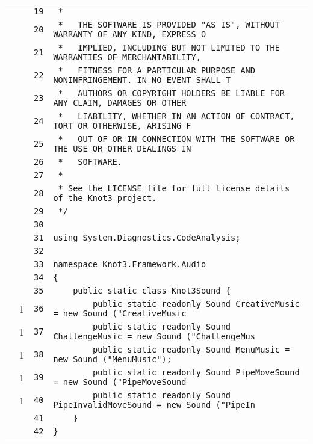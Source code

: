 \documentclass[a4paper,10pt]{article}
\begin{document}
\begin{longtable}[l]{lrrl}
\cellcolor{gray} &  & \verb~19~ & \verb~ *~\\
\cellcolor{gray} &  & \verb~20~ & \verb~ *   THE SOFTWARE IS PROVIDED "AS IS", WITHOUT WARRANTY OF ANY KIND, EXPRESS O~\\
\cellcolor{gray} &  & \verb~21~ & \verb~ *   IMPLIED, INCLUDING BUT NOT LIMITED TO THE WARRANTIES OF MERCHANTABILITY,~\\
\cellcolor{gray} &  & \verb~22~ & \verb~ *   FITNESS FOR A PARTICULAR PURPOSE AND NONINFRINGEMENT. IN NO EVENT SHALL T~\\
\cellcolor{gray} &  & \verb~23~ & \verb~ *   AUTHORS OR COPYRIGHT HOLDERS BE LIABLE FOR ANY CLAIM, DAMAGES OR OTHER~\\
\cellcolor{gray} &  & \verb~24~ & \verb~ *   LIABILITY, WHETHER IN AN ACTION OF CONTRACT, TORT OR OTHERWISE, ARISING F~\\
\cellcolor{gray} &  & \verb~25~ & \verb~ *   OUT OF OR IN CONNECTION WITH THE SOFTWARE OR THE USE OR OTHER DEALINGS IN~\\
\cellcolor{gray} &  & \verb~26~ & \verb~ *   SOFTWARE.~\\
\cellcolor{gray} &  & \verb~27~ & \verb~ *~\\
\cellcolor{gray} &  & \verb~28~ & \verb~ * See the LICENSE file for full license details of the Knot3 project.~\\
\cellcolor{gray} &  & \verb~29~ & \verb~ */~\\
\cellcolor{gray} &  & \verb~30~ & \verb~~\\
\cellcolor{gray} &  & \verb~31~ & \verb~using System.Diagnostics.CodeAnalysis;~\\
\cellcolor{gray} &  & \verb~32~ & \verb~~\\
\cellcolor{gray} &  & \verb~33~ & \verb~namespace Knot3.Framework.Audio~\\
\cellcolor{gray} &  & \verb~34~ & \verb~{~\\
\cellcolor{gray} &  & \verb~35~ & \verb~    public static class Knot3Sound {~\\
\cellcolor{green} & 1 & \verb~36~ & \verb~        public static readonly Sound CreativeMusic = new Sound ("CreativeMusic~\\
\cellcolor{green} & 1 & \verb~37~ & \verb~        public static readonly Sound ChallengeMusic = new Sound ("ChallengeMus~\\
\cellcolor{green} & 1 & \verb~38~ & \verb~        public static readonly Sound MenuMusic = new Sound ("MenuMusic");~\\
\cellcolor{green} & 1 & \verb~39~ & \verb~        public static readonly Sound PipeMoveSound = new Sound ("PipeMoveSound~\\
\cellcolor{green} & 1 & \verb~40~ & \verb~        public static readonly Sound PipeInvalidMoveSound = new Sound ("PipeIn~\\
\cellcolor{gray} &  & \verb~41~ & \verb~    }~\\
\cellcolor{gray} &  & \verb~42~ & \verb~}~\\
\end{longtable}
\newpage
\end{document}
